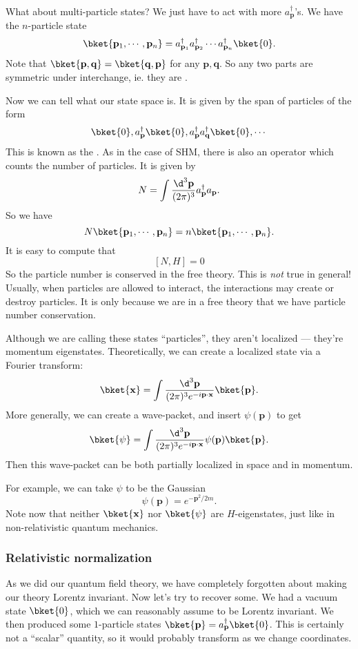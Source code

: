 \documentclass[a4paper]{article}
\begin{document}

What about multi-particle states? We just have to act with more $a_\mathbf{p}^\dagger$'s. We have the $n$-particle state
\[
  \bket{\mathbf{p}_1, \cdots, \mathbf{p}_n} = a_{\mathbf{p}_1}^\dagger a_{\mathbf{p}_2}^\dagger \cdots a_{\mathbf{p}_n}^\dagger \bket{0}.
\]
Note that $\bket{\mathbf{p}, \mathbf{q}} = \bket{\mathbf{q}, \mathbf{p}}$ for any $\mathbf{p}, \mathbf{q}$. So any two parts are symmetric under interchange, ie. they are .

Now we can tell what our state space is. It is given by the span of particles of the form
\[
  \bket{0}, a_\mathbf{p}^\dagger \bket{0}, a_\mathbf{p}^\dagger a_\mathbf{q}^{\dagger}\bket{0}, \cdots
\]
This is known as the . As in the case of SHM, there is also an operator which counts the number of particles. It is given by
\[
  N = \int \frac{\d^3 \mathbf{p}}{(2\pi)^3} a_\mathbf{p}^\dagger a_\mathbf{p}.
\]
So we have
\[
  N\bket{\mathbf{p}_1, \cdots, \mathbf{p}_n} = n\bket{\mathbf{p}_1, \cdots, \mathbf{p}_n}.
\]
It is easy to compute that
\[
  [N, H] = 0
\]
So the particle number is conserved in the free theory. This is \emph{not} true in general! Usually, when particles are allowed to interact, the interactions may create or destroy particles. It is only because we are in a free theory that we have particle number conservation.

Although we are calling these states ``particles'', they aren't localized --- they're momentum eigenstates. Theoretically, we can create a localized state via a Fourier transform:
\[
  \bket{\mathbf{x}} = \int\frac{\d^3 \mathbf{p}}{(2\pi)^3 e^{-i\mathbf{p}\cdot \mathbf{x}}}\bket{\mathbf{p}}.
\]
More generally, we can create a wave-packet, and insert $\psi(\mathbf{p})$ to get
\[
  \bket{\psi} = \int\frac{\d^3 \mathbf{p}}{(2\pi)^3 e^{-i\mathbf{p}\cdot \mathbf{x}}}\psi(\mathbf{p})\bket{\mathbf{p}}.
\]
Then this wave-packet can be both partially localized in space and in momentum.

For example, we can take $\psi$ to be the Gaussian
\[
  \psi(\mathbf{p}) = e^{-\mathbf{p}^2/2m}.
\]
Note now that neither $\bket{\mathbf{x}}$ nor $\bket{\psi}$ are $H$-eigenstates, just like in non-relativistic quantum mechanics.

\subsubsection*{Relativistic normalization}
As we did our quantum field theory, we have completely forgotten about making our theory Lorentz invariant. Now let's try to recover some. We had a vacuum state $\bket{0}$, which we can reasonably assume to be Lorentz invariant. We then produced some $1$-particle states $\bket{\mathbf{p}} = a_\mathbf{p}^\dagger \bket{0}$. This is certainly not a ``scalar'' quantity, so it would probably transform as we change coordinates.
\end{document}
